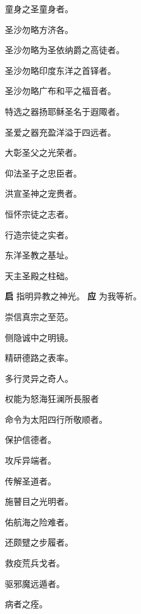 \documentclass[UTF8,17pt]{ctexart}
\begin{document}
 童⾝之圣童⾝者。

 圣沙勿略⽅济各。

 圣沙勿略为圣依纳爵之⾼徒者。

 圣沙勿略印度东洋之⾸铎者。

 圣沙勿略⼴布和平之福⾳者。

 特选之器扬耶稣圣名于遐陬者。

 圣爱之器充盈洋溢于四远者。

 ⼤彰圣⽗之光荣者。

 仰法圣⼦之忠⾂者。

 洪宣圣神之宠赉者。

 恒怀宗徒之志者。

 ⾏造宗徒之实者。

 东洋圣教之基址。

 天主圣殿之柱础。

\textbf{启} \quad 指明异教之神光。 \hfill \textbf{应} \quad 为我等祈。

 崇信真宗之⾄范。

 侧隐诚中之明镜。

 精研德路之表率。

 多⾏灵异之奇⼈。

 权能为怒海狂澜所⾧服者

 命令为太阳四行所敬顺者。

 保护信德者。

 攻斥异端者。

 传解圣道者。

 施瞽⽬之光明者。

 佑航海之险难者。

 还颇躄之步履者。

 救疫荒兵⼽者。

 驱邪魔远遁者。

 病者之痊。
\end{document}
